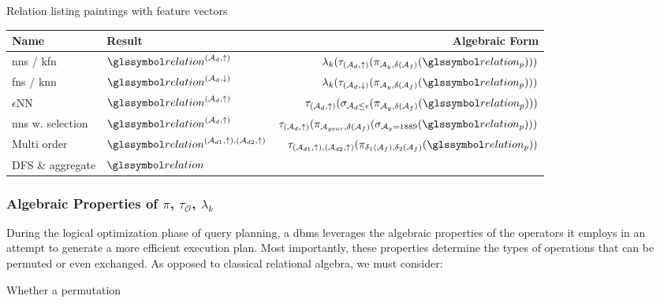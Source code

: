 \begin{example}[label=example:rel_painting_w_features]{Relation listing paintings with feature vectors}{}
    \begin{center}
        \begin{tabular}{||l l r ||} 
         \hline
         Name & Result & Algebraic Form \\
         \hline\hline
         \acrshort{nns} / \acrshort{kfn} & $\relation^{(\mathcal{A}_d,\uparrow)}$ & $\lambda_k (\tau_{(\mathcal{A}_d,\uparrow)} ( \pi_{\mathcal{A}_{y}, \delta(\mathcal{A}_{f})}  ( \relation_p)))$  \\ 
         \hline
         \acrshort{fns} / \acrshort{knn}& $\relation^{(\mathcal{A}_d,\downarrow)}$ & $\lambda_k (\tau_{(\mathcal{A}_d,\downarrow)} ( \pi_{\mathcal{A}_{y}, \delta(\mathcal{A}_{f})}  ( \relation_p)))$   \\
         \hline
         $\epsilon$NN & $\relation^{(\mathcal{A}_d,\uparrow)}$ & $\tau_{(\mathcal{A}_d,\uparrow)} ( \sigma_{\mathcal{A}_d \leq \epsilon} ( \pi_{\mathcal{A}_{y}, \delta(\mathcal{A}_{f})} ( \relation_p)) )$  \\
         \hline
         \acrshort{nns} w. selection & $\relation^{(\mathcal{A}_d,\uparrow)}$ &  $\tau_{(\mathcal{A}_d,\uparrow)} ( \pi_{\mathcal{A}_{year}, \delta(\mathcal{A}_{f})} ( \sigma_{\mathcal{A}_{y} = 1889} ( \relation_p)) )$\\
         \hline
         Multi order & $\relation^{(\mathcal{A}_{d1},\uparrow),(\mathcal{A}_{d2},\uparrow)}$ & $\tau_{(\mathcal{A}_{d1},\uparrow),(\mathcal{A}_{d2},\uparrow)} ( \pi_{\delta_1(\mathcal{A}_{f}), \delta_2(\mathcal{A}_{f})}  ( \relation_p))$ \\ 
         \hline
         DFS \& aggregate & $\relation$ & \\ 
         \hline
        \end{tabular}
    \end{center}

\end{example}

\subsubsection{Algebraic Properties of  \texorpdfstring{$\pi$}{Pi}, \texorpdfstring{$\tau_{\mathcal{O}}$}{Tau}, \texorpdfstring{$\lambda_k$}{Lambda}}

During the logical optimization phase of query planning, a \acrshort{dbms} leverages the algebraic properties of the operators it employs in an attempt to generate a more efficient execution plan. Most importantly, these properties determine the types of operations that can be permuted or even exchanged. As opposed to classical relational algebra, we must consider:
\begin{enumerate*}[label=(\roman*)]
     \item Whether a permutation  
\end{enumerate*}

